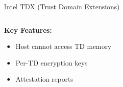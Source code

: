 \documentclass[aspectratio=169,12pt]{beamer}
\begin{document}
\begin{frame}{Intel TDX (Trust Domain Extensions)}
\begin{columns}
\begin{column}{0.5\textwidth}
            
            \vspace{0.3cm}
            \textbf{Key Features:}
            \begin{itemize}
                \item Host cannot access TD memory
                \item Per-TD encryption keys
                \item Attestation reports
            \end{itemize}
        \end{column}
    \end{columns}
\end{frame}
\end{document}
